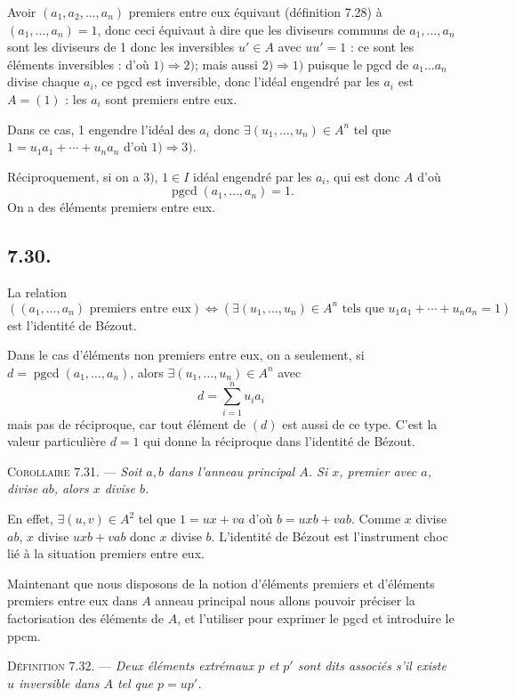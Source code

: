 Avoir $(a_1,a_2,\ldots,a_n)$ premiers entre eux équivaut (définition 7.28) à $(a_1,\ldots,a_n)=1$, donc ceci équivaut à dire que les diviseurs communs de $a_1,\ldots,a_n$ sont les diviseurs de 1 donc les inversibles $u'\in A$ avec $uu'=1$ : ce sont les éléments inversibles : d'où $1)\Rightarrow2)$; mais aussi $2)\Rightarrow1)$ puisque le pgcd de $a_1\ldots a_n$ divise chaque $a_i$, ce pgcd est inversible, donc l'idéal engendré par les $a_i$ est $A=(1)$ : les $a_i$ sont premiers entre eux.

Dans ce cas, 1 engendre l'idéal des $a_i$ donc $\exists(u_1,\ldots,u_n)\in A^n$ tel que $1=u_1a_1+\cdots+u_na_n$ d'où $1)\Rightarrow3)$.

Réciproquement, si on a $3)$, $1\in I$ idéal engendré par les $a_i$, qui est donc $A$ d'où\[\operatorname{pgcd}(a_1,\ldots,a_n)=1.\]On a des éléments premiers entre eux. \bookend

\subsection*{7.30.}

La relation
\[
((a_1,\ldots,a_n)\text{ premiers entre eux})\Longleftrightarrow(\exists(u_1,\ldots,u_n)\in A^n\text{ tels que }u_1a_1+\cdots+u_na_n=1)
\]
est l'identité de Bézout.

Dans le cas d'éléments non premiers entre eux, on a seulement, si $d=\operatorname{pgcd}(a_1,\ldots,a_n)$, alors $\exists(u_1,\ldots,u_n)\in A^n$ avec
\[
d=\sum_{i=1}^n u_ia_i
\]
mais pas de réciproque, car tout élément de $(d)$ est aussi de ce type. C'est la valeur particulière $d=1$ qui donne la réciproque dans l'identité de Bézout.

\medskip\noindent\textsc{Corollaire 7.31.} --- \emph{Soit $a,b$ dans l'anneau principal $A$. Si $x$, premier avec $a$, divise $ab$, alors $x$ divise $b$.}

En effet, $\exists(u,v)\in A^2$ tel que $1=ux+va$ d'où $b=uxb+vab$. Comme $x$ divise $ab$, $x$ divise $uxb+vab$ donc $x$ divise $b$. L'identité de Bézout est l'instrument choc lié à la situation premiers entre eux.

Maintenant que nous disposons de la notion d'éléments premiers et d'éléments premiers entre eux dans $A$ anneau principal nous allons pouvoir préciser la factorisation des éléments de $A$, et l'utiliser pour exprimer le pgcd et introduire le ppcm.

\medskip\noindent\textsc{Définition 7.32.} --- \emph{Deux éléments extrémaux $p$ et $p'$ sont dits associés s'il existe $u$ inversible dans $A$ tel que $p=up'$.}

